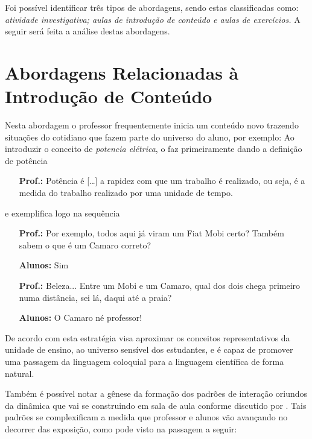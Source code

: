 Foi possível identificar três tipos de abordagens, sendo estas classificadas como: \emph{atividade investigativa; aulas de introdução de conteúdo e aulas de exercícios.} A seguir será feita a análise destas abordagens.

\section{Abordagens Relacionadas à Introdução de Conteúdo}
Nesta abordagem o professor frequentemente inicia um conteúdo novo trazendo situações do cotidiano que fazem parte do universo do aluno, por exemplo: Ao introduzir o conceito de \emph{potencia elétrica}, o faz primeiramente dando a definição de potência
\begin{center}
    \begin{minipage}{0.7\textwidth}
        \begin{itemize}
            \item[\textbf{Prof.:}] Potência é [\ldots] a rapidez com que um trabalho é realizado, ou seja, é a medida do trabalho realizado por uma unidade de tempo.
        \end{itemize}
    \end{minipage}
\end{center}
e exemplifica logo na sequência
\begin{center}
    \begin{minipage}{0.7\textwidth}
        \begin{itemize}
            \item[\textbf{Prof.:}] Por exemplo, todos aqui já viram um Fiat Mobi certo? Também sabem o que é um Camaro correto?
            \item[\textbf{Alunos:}] Sim
            \item[\textbf{Prof.:}] Beleza... Entre um Mobi e um Camaro, qual dos dois chega primeiro numa distância, sei lá, daqui até a praia?
            \item[\textbf{Alunos:}] O Camaro né professor!
        \end{itemize}
    \end{minipage}
\end{center}
De acordo com \cite{Carvalho1999} esta estratégia visa aproximar os conceitos representativos da unidade de ensino, ao universo sensível dos estudantes, e é capaz de promover uma passagem da linguagem coloquial para a linguagem científica de forma natural.

Também é possível notar a gênese da formação dos padrões de interação oriundos da dinâmica que vai se construindo em sala de aula conforme discutido por \cite{MORTIMER2002}. Tais padrões se complexificam a medida que professor e alunos vão avançando no decorrer das exposição, como pode visto na passagem a seguir:

